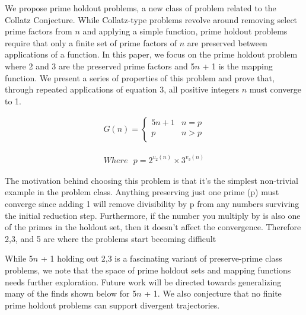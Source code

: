\documentclass{article}
\begin{document}
We propose prime holdout problems, a new class of problem related to the Collatz Conjecture. While Collatz-type problems revolve around removing select prime factors from $n$ and applying a simple function, prime holdout problems require that only a finite set of prime factors of $n$ are preserved between applications of a function. In this paper, we focus on the prime holdout problem where 2 and 3 are the preserved prime factors and 5$n$ + 1 is the mapping function. We present a series of properties of this problem and prove that, through repeated applications of equation 3, all positive integers $n$ 
must converge to 1.


\begin{ceqn}
\begin{align}
    G(n) = \begin{cases} 
      5n + 1 & n = p \\
      p & n > p \\
   \end{cases}
\end{align}
\end{ceqn}
\nonumber
\begin{ceqn}
\begin{align}
Where \text{ } p = 2^{v_2(n)} \times 3^{v_3(n)}
\end{align}
\end{ceqn}

The motivation behind choosing this problem is that it's the simplest non-trivial example in the problem class. Anything preserving just one prime (p) must converge since adding 1 will remove divisibility by p from any numbers surviving the initial reduction step. Furthermore, if the number you multiply by is also one of the primes in the holdout set, then it doesn't affect the convergence. Therefore 2,3, and 5 are where the problems start becoming difficult

While 5$n$ + 1 holding out 2,3 is a fascinating variant of preserve-prime class problems, we note that the space of prime holdout sets and mapping functions needs further exploration. Future work will be directed towards generalizing many of the finds shown below for 5$n$ + 1. We also conjecture that no finite prime holdout problems can support divergent trajectories.
\end{document}
